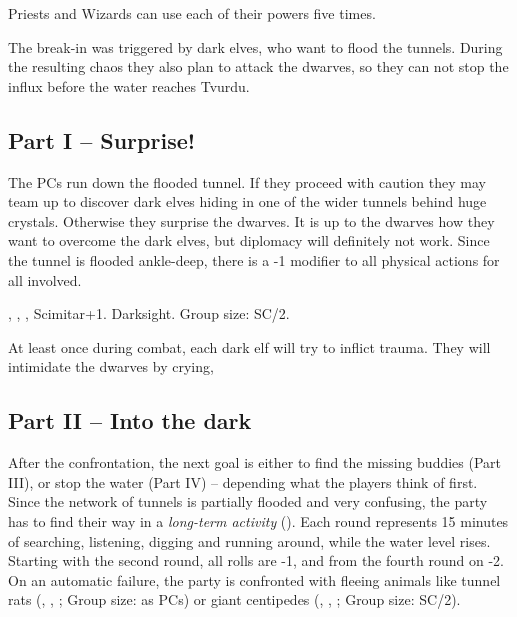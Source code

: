 {		

		\noindent
		Priests and Wizards can use each of their powers five times.


		\noindent
		The break-in was triggered by dark elves, who want to flood the tunnels. During the resulting chaos they also plan to attack the dwarves, so they can not stop the influx before the water reaches Tvurdu.

		\subsection{Part I -- Surprise!}

		\noindent
		The PCs run down the flooded tunnel. If they proceed with caution they may team up  to discover dark elves hiding in one of the wider tunnels behind huge crystals. Otherwise they surprise the dwarves. It is up to the dwarves how they want to overcome the dark elves, but diplomacy will definitely not work. Since the tunnel is flooded ankle-deep, there is a -1 modifier to all physical actions for all involved.

		 , , , Scimitar+1. Darksight. Group size: SC/2.

		At least once during combat, each dark elf will try to inflict trauma. They will intimidate the dwarves by crying, 

		\subsection{Part II -- Into the dark}

		After the confrontation, the next goal is either to find the missing buddies (Part III), or stop the water (Part IV) -- depending what the players think of first. Since the network of tunnels is partially flooded and very confusing, the party has to find their way in a \emph{long-term activity} (). Each round represents 15 minutes of searching, listening, digging and running around, while the water level rises. Starting with the second round, all rolls are -1, and from the fourth round on -2. On an automatic failure, the party is confronted with fleeing animals like tunnel rats (, , ; Group size: as PCs) or giant centipedes (, , ; Group size: SC/2).

}

